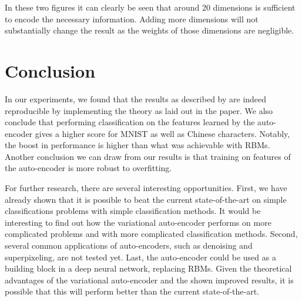\documentclass{article}
\begin{document}
In these two figures it can clearly be seen that around 20 dimensions is sufficient to encode the necessary information. Adding more dimensions will not substantially change the result as the weights of those dimensions are negligible.


\section*{Conclusion}

In our experiments, we found that the results as described by \cite{kingma2013auto} are indeed reproducible by implementing the theory as laid out in the paper. We also conclude that performing classification on the features learned by the auto-encoder gives a higher score for MNIST as well as Chinese characters. Notably, the boost in performance is higher than what was achievable with RBMs. Another conclusion we can draw from our results is that training on features of the auto-encoder is more robust to overfitting. 

For further research, there are several interesting opportunities. First, we have already shown that it is possible to beat the current state-of-the-art on simple classifications problems with simple classification methods. It would be interesting to find out how the variational auto-encoder performs on more complicated problems and with more complicated classification methods. Second, several common applications of auto-encoders, such as denoising and superpixeling, are not tested yet. Last, the auto-encoder could be used as a building block in a deep neural network, replacing RBMs. Given the theoretical advantages of the variational auto-encoder and the shown improved results, it is possible that this will perform better than the current state-of-the-art.


\pagebreak 


\end{document}
